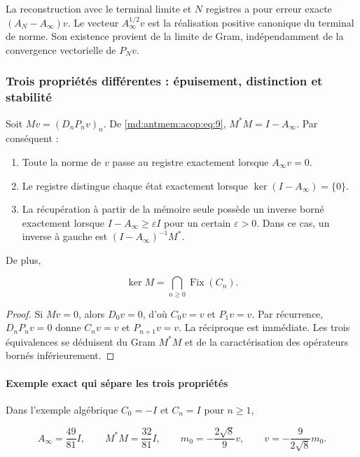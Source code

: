 La reconstruction avec le terminal limite et \(N\) registres a pour erreur
exacte \((A_N-A_\infty)v\). Le vecteur \(A_\infty^{1/2}v\) est la
réalisation positive canonique du terminal de norme. Son existence provient
de la limite de Gram, indépendamment de la convergence vectorielle de \(P_Nv\).


\subsubsection{Trois propriétés différentes : épuisement, distinction et stabilité}

Soit \(Mv=(D_nP_nv)_n\). De \eqref{md:antmem:acop:eq:9}, \(M^*M=I-A_\infty\). Par conséquent :

\begin{enumerate}
\item Toute la norme de \(v\) passe au registre exactement lorsque \(A_\infty v=0\).

\item Le registre distingue chaque état exactement lorsque \(\ker(I-A_\infty)=\{0\}\).
\item La récupération à partir de la mémoire seule possède un inverse borné exactement lorsque
\(I-A_\infty\geq\varepsilon I\) pour un certain \(\varepsilon>0\).
Dans ce cas, un inverse à gauche est \((I-A_\infty)^{-1}M^*\).

\end{enumerate}

De plus,

\begin{equation}
\boxed{\ker M=\bigcap_{n\ge0}\operatorname{Fix}(C_n).}
\label{md:antmem:acop:eq:12}
\end{equation}

\begin{proof}
Si \(Mv=0\), alors \(D_0v=0\), d’où \(C_0v=v\)
et \(P_1v=v\). Par récurrence, \(D_nP_nv=0\) donne \(C_nv=v\) et
\(P_{n+1}v=v\). La réciproque est immédiate. Les trois équivalences se
déduisent du Gram \(M^*M\) et de la caractérisation des opérateurs
bornés inférieurement.
\end{proof}

\paragraph{Exemple exact qui sépare les trois propriétés}

Dans l’exemple algébrique \(C_0=-I\) et \(C_n=I\) pour \(n\geq1\),

\begin{equation}
A_\infty=\frac{49}{81}I,\qquad M^*M=\frac{32}{81}I,
\qquad m_0=-\frac{2\sqrt8}{9}v,
\qquad v=-\frac9{2\sqrt8}m_0.
\label{md:antmem:acop:eq:13}
\end{equation}

